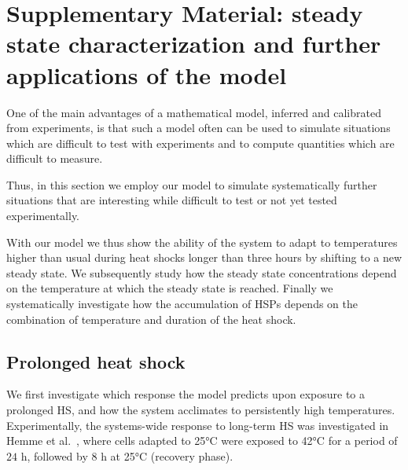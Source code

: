 \documentclass[oneside, 10pt, a4paper, twocolumn]{article}
\begin{document}
\clearpage





\section{Supplementary Material: steady state characterization and further applications of the model}
\label{SectionFurtherPredictions}

One of the main advantages of a mathematical model, inferred and calibrated from experiments, is that {such a model often can be used to simulate situations which are difficult to test with experiments and to compute quantities which are difficult to measure.}

Thus, in this section we employ our model to simulate {systematically} further situations that are interesting while difficult to test or not yet tested experimentally. 

With our model we thus show the ability of the system to adapt to temperatures higher than usual during heat shocks longer than three hours by shifting to a new steady state. 
We subsequently study how the steady state concentrations depend on the temperature at which the steady state is reached. 
Finally we systematically investigate how the accumulation of HSPs depends on the combination of temperature and duration of the heat shock. 





\subsection{Prolonged heat shock}
\label{SecAcclimation}

We first investigate which response the model predicts upon exposure to a prolonged HS, and how
the system {acclimates} to persistently high temperatures.
Experimentally, the systems-wide response to long-term HS was investigated in Hemme et al.~\cite{Hemme2014},
where cells adapted to 25°C were exposed to 42°C for a period of $24$ h, followed by $8$ h at 25°C (recovery phase).

\end{document}
